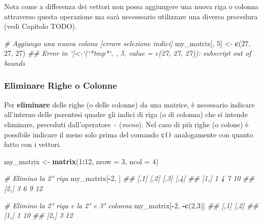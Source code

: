\documentclass[
]{book}
\newenvironment{Shaded}{\begin{snugshade}}{\end{snugshade}}
\newcommand{\CommentTok}[1]{\textcolor[rgb]{0.56,0.35,0.01}{\textit{#1}}}
\newcommand{\DataTypeTok}[1]{\textcolor[rgb]{0.13,0.29,0.53}{#1}}
\newcommand{\DecValTok}[1]{\textcolor[rgb]{0.00,0.00,0.81}{#1}}
\newcommand{\KeywordTok}[1]{\textcolor[rgb]{0.13,0.29,0.53}{\textbf{#1}}}
\newcommand{\NormalTok}[1]{#1}
\newcommand{\OperatorTok}[1]{\textcolor[rgb]{0.81,0.36,0.00}{\textbf{#1}}}
\newcommand{\StringTok}[1]{\textcolor[rgb]{0.31,0.60,0.02}{#1}}
\begin{document}
Nota come a differenza dei vettori non possa aggiungere una nuova riga o colonna attraverso questa operazione ma sarà necesssario utilizzare una diversa procedura (vedi Capitolo TODO).

\begin{Shaded}
\begin{Highlighting}[]
\CommentTok{# Aggiungo una nuova colona [errore selezione indici]}
\NormalTok{my_matrix[, }\DecValTok{5}\NormalTok{] <-}\StringTok{ }\KeywordTok{c}\NormalTok{(}\DecValTok{27}\NormalTok{, }\DecValTok{27}\NormalTok{, }\DecValTok{27}\NormalTok{)}
\CommentTok{## Error in `[<-`(`*tmp*`, , 5, value = c(27, 27, 27)): subscript out of bounds}
\end{Highlighting}
\end{Shaded}

\hypertarget{eliminare-righe-o-colonne}{%
\subsubsection*{Eliminare Righe o Colonne}\label{eliminare-righe-o-colonne}}

Per \textbf{eliminare} delle righe (o delle colonne) da una matrice, è necessario indicare all'interno delle parentesi quadre gli indici di riga (o di colonna) che si intende eliminare, preceduti dall'operatore \texttt{-} (\emph{meno}). Nel caso di più righe (o colone) è possibile indicare il meno solo prima del comando \texttt{c()} analogamente con quanto fatto con i vettori.

\begin{Shaded}
\begin{Highlighting}[]
\NormalTok{my_matrix <-}\StringTok{ }\KeywordTok{matrix}\NormalTok{(}\DecValTok{1}\OperatorTok{:}\DecValTok{12}\NormalTok{, }\DataTypeTok{nrow =} \DecValTok{3}\NormalTok{, }\DataTypeTok{ncol =} \DecValTok{4}\NormalTok{)}

\CommentTok{# Elimino la 2° riga}
\NormalTok{my_matrix[}\OperatorTok{-}\DecValTok{2}\NormalTok{, ]}
\CommentTok{##      [,1] [,2] [,3] [,4]}
\CommentTok{## [1,]    1    4    7   10}
\CommentTok{## [2,]    3    6    9   12}

\CommentTok{# Elimino la 2° riga  e la 2° e 3° colonna}
\NormalTok{my_matrix[}\OperatorTok{-}\DecValTok{2}\NormalTok{, }\OperatorTok{-}\KeywordTok{c}\NormalTok{(}\DecValTok{2}\NormalTok{,}\DecValTok{3}\NormalTok{)]}
\CommentTok{##      [,1] [,2]}
\CommentTok{## [1,]    1   10}
\CommentTok{## [2,]    3   12}
\end{Highlighting}
\end{Shaded}
\end{document}
